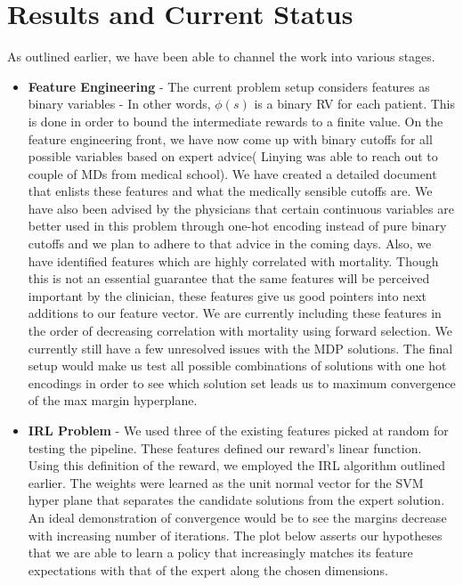 \documentclass[twoside,11pt]{article}
\begin{document}
\section{Results and Current Status}\label{results}
As outlined earlier, we have been able to channel the work into various stages.
\begin{itemize}
\item \textbf{Feature Engineering} - The current problem setup considers features as binary variables - In other words, $\phi(s)$ is a binary RV for each patient. This is done in order to bound the intermediate rewards to a finite value. On the feature engineering front, we have now come up with binary cutoffs for all possible variables based on expert advice( Linying was able to reach out to couple of MDs from medical school). We have created a detailed document that enlists these features and what the medically sensible cutoffs are. We have also been advised by the physicians that certain continuous variables are better used in this problem through one-hot encoding instead of pure binary cutoffs and we plan to adhere to that advice in the coming days. Also, we have identified features which are highly correlated with mortality. Though this is not an essential guarantee that the same features will be perceived important by the clinician, these features give us good pointers into next additions to our feature vector. We are currently including these features in the order of decreasing correlation with mortality using forward selection. We currently still have a few unresolved issues with the MDP solutions. The final setup would make us test all possible combinations of solutions with one hot encodings in order to see which solution set leads us to maximum convergence of the max margin hyperplane.
\item \textbf{IRL Problem} - We used three of the existing features picked at random for testing the pipeline. These features defined our reward's linear function. Using this definition of the reward, we employed the IRL algorithm outlined earlier. The weights were learned as the unit normal vector for the SVM hyper plane that separates the candidate solutions from the expert solution. An ideal demonstration of convergence would be to see the margins decrease with increasing number of iterations. The plot below asserts our hypotheses that we are able to learn a policy that increasingly matches its feature expectations with that of the expert along the chosen dimensions.\\[10pt]
\begin{center}

\end{center}
\end{itemize}
\end{document}
